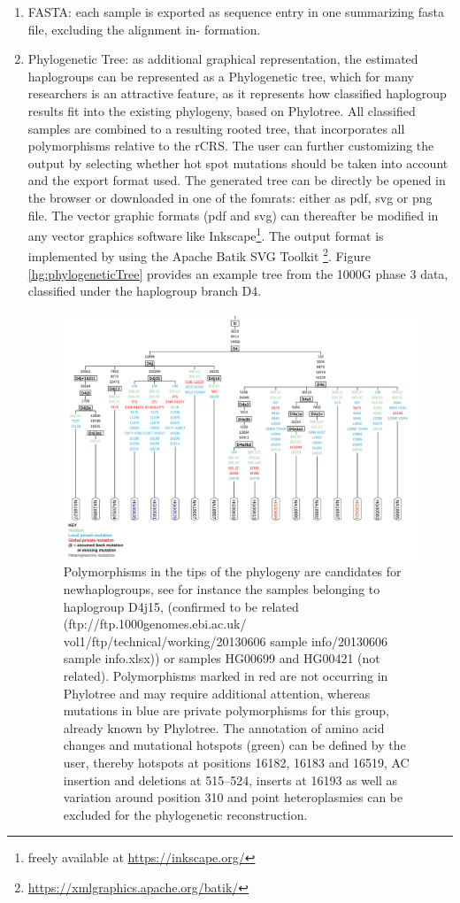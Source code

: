 \begin{enumerate}
\item  FASTA: each sample is exported as sequence entry in one summarizing fasta file, excluding the alignment in- formation.
\item Phylogenetic Tree: as additional graphical representation, the estimated haplogroups can be represented as a Phylogenetic tree, which for many researchers is an attractive feature, as it represents how classified haplogroup results fit into the existing phylogeny, based on Phylotree. All classified samples are combined to a resulting rooted tree, that incorporates all polymorphisms relative to the rCRS. The user can further customizing the output by selecting whether hot spot mutations should be taken into account and the export format used. The generated tree can be directly be opened in the browser or downloaded in one of the fomrats: either as pdf, svg or png file. The vector graphic formats (pdf and svg) can thereafter be modified in any vector graphics software like Inkscape\footnote{freely available at \url{https://inkscape.org/}}. The output format is implemented by using the Apache Batik SVG Toolkit \footnote{\url{https://xmlgraphics.apache.org/batik/}}. Figure \ref{hg:phylogeneticTree} provides an example tree from the 1000G phase 3 data, classified under the haplogroup branch D4.
\begin{figure}[!ht]
    \centering
    \includegraphics[width=1\textwidth]{images/tree.png}
    \caption[Export of Graphical Phylogenetic Tree]{Polymorphisms in the tips of the phylogeny are candidates for newhaplogroups, see for instance the samples belonging to haplogroup D4j15, (confirmed to be related (ftp://ftp.1000genomes.ebi.ac.uk/ vol1/ftp/technical/working/20130606 sample info/20130606 sample info.xlsx)) or samples HG00699 and HG00421 (not related). Polymorphisms marked in red are not occurring in Phylotree and may require additional attention, whereas mutations in blue are private polymorphisms for this group, already known by Phylotree. The annotation of amino acid changes and mutational hotspots (green) can be defined by the user, thereby hotspots at positions 16182, 16183 and 16519, AC insertion and deletions at 515–524, inserts at 16193 as well as variation around position 310 and point heteroplasmies can be excluded for the phylogenetic reconstruction. } 

\end{figure}
\end{enumerate}
